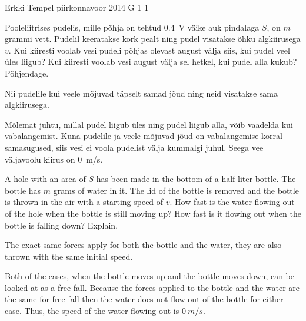 {Erkki Tempel} %
{piirkonnavoor} %
{2014} %
{G 1} %
{1} %
{
\ifStatement
Pooleliitrises pudelis, mille põhja on tehtud \SI{0.4}{V} väike auk pindalaga $S$, on $m$ grammi vett. Pudelil keeratakse kork pealt ning pudel visatakse õhku algkiirusega $v$. Kui kiiresti voolab vesi pudeli põhjas olevast august välja siis, kui pudel veel üles liigub? Kui kiiresti voolab vesi august välja sel hetkel, kui pudel alla kukub? Põhjendage.
\fi


\ifHint
Nii pudelile kui veele mõjuvad täpselt samad jõud ning neid visatakse sama algkiirusega.
\fi


\ifSolution
Mõlemat juhtu, millal pudel liigub üles ning pudel liigub alla, võib vaadelda kui vabalangemist. Kuna pudelile ja veele mõjuvad  jõud on vabalangemise korral samasugused, siis vesi ei voola pudelist välja kummalgi juhul. Seega vee väljavoolu kiirus on \SI{0}{m/s}.
\fi


\ifEngStatement
A hole with an area of $S$ has been made in the bottom of a half-liter bottle. The bottle has $m$ grams of water in it. The lid of the bottle is removed and the bottle is thrown in the air with a starting speed of $v$. How fast is the water flowing out of the hole when the bottle is still moving up? How fast is it flowing out when the bottle is falling down? Explain.
\fi


\ifEngHint
The exact same forces apply for both the bottle and the water, they are also thrown with the same initial speed.
\fi


\ifEngSolution
Both of the cases, when the bottle moves up and the bottle moves down, can be looked at as a free fall. Because the forces applied to the bottle and the water are the same for free fall then the water does not flow out of the bottle for either case. Thus, the speed of the water flowing out is $\SI{0}{m/s}$.
\fi
}